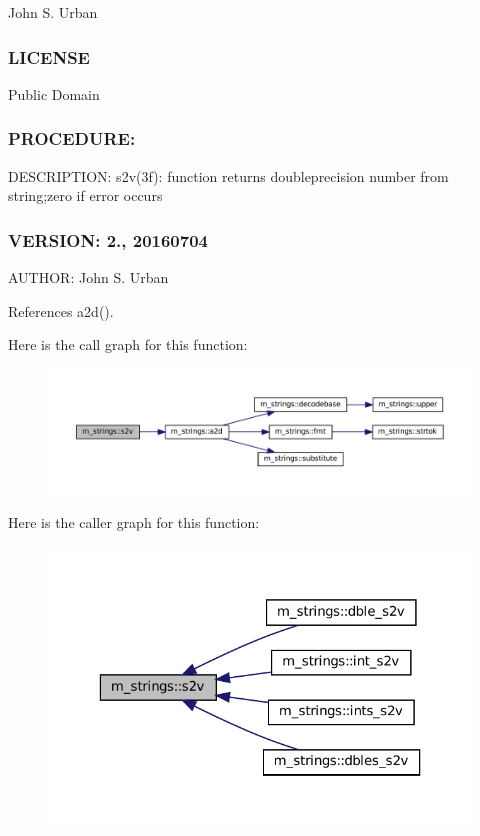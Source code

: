 John S. Urban \subsubsection*{L\+I\+C\+E\+N\+SE}

Public Domain

\subsubsection*{P\+R\+O\+C\+E\+D\+U\+RE\+:}

D\+E\+S\+C\+R\+I\+P\+T\+I\+ON\+: s2v(3f)\+: function returns doubleprecision number from string;zero if error occurs \subsubsection*{V\+E\+R\+S\+I\+ON\+: 2., 20160704}

A\+U\+T\+H\+OR\+: John S. Urban 

References a2d().

Here is the call graph for this function\+:\nopagebreak
\begin{figure}[H]
\begin{center}
\leavevmode
\includegraphics[width=350pt]{namespacem__strings_ae0e2fe7c93e581402a74a7b59e5bb07f_cgraph}
\end{center}
\end{figure}
Here is the caller graph for this function\+:\nopagebreak
\begin{figure}[H]
\begin{center}
\leavevmode
\includegraphics[width=323pt]{namespacem__strings_ae0e2fe7c93e581402a74a7b59e5bb07f_icgraph}
\end{center}
\end{figure}
\mbox{\label{namespacem__strings_ad7fffe79559a666aa28e1ed598b8670f}} 
